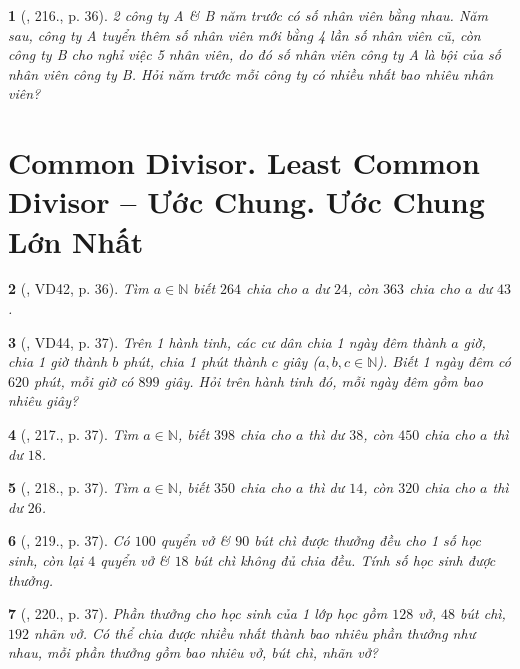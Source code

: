\documentclass{article}
\newtheorem{baitoan}{}
\begin{document}
\begin{baitoan}[\cite{Binh_Toan_6_tap_1}, 216., p. 36]
	2 công ty A \& B năm trước có số nhân viên bằng nhau. Năm sau, công ty A tuyển thêm số nhân viên mới bằng 4 lần số nhân viên cũ, còn công ty B cho nghỉ việc 5 nhân viên, do đó số nhân viên công ty A là bội của số nhân viên công ty B. Hỏi năm trước mỗi công ty có nhiều nhất bao nhiêu nhân viên?
\end{baitoan}


\section{Common Divisor. Least Common Divisor -- Ước Chung. Ước Chung Lớn Nhất}

\begin{baitoan}[\cite{Binh_Toan_6_tap_1}, VD42, p. 36]
	Tìm $a\in\mathbb{N}$ biết $264$ chia cho $a$ dư $24$, còn $363$ chia cho $a$ dư $43$.
\end{baitoan}

\begin{baitoan}[\cite{Binh_Toan_6_tap_1}, VD44, p. 37]
	Trên 1 hành tinh, các cư dân chia 1 ngày đêm thành $a$ giờ, chia 1 giờ thành $b$ phút, chia 1 phút thành $c$ giây ($a,b,c\in\mathbb{N}$). Biết 1 ngày đêm có $620$ phút, mỗi giờ có $899$ giây. Hỏi trên hành tinh đó, mỗi ngày đêm gồm bao nhiêu giây?
\end{baitoan}

\begin{baitoan}[\cite{Binh_Toan_6_tap_1}, 217., p. 37]
	Tìm $a\in\mathbb{N}$, biết $398$ chia cho $a$ thì dư $38$, còn $450$ chia cho $a$ thì dư $18$.
\end{baitoan}

\begin{baitoan}[\cite{Binh_Toan_6_tap_1}, 218., p. 37]
	Tìm $a\in\mathbb{N}$, biết $350$ chia cho $a$ thì dư $14$, còn $320$ chia cho $a$ thì dư $26$.
\end{baitoan}

\begin{baitoan}[\cite{Binh_Toan_6_tap_1}, 219., p. 37]
	Có $100$ quyển vở \& $90$ bút chì được thưởng đều cho 1 số học sinh, còn lại $4$ quyển vở \& $18$ bút chì không đủ chia đều. Tính số học sinh được thưởng.
\end{baitoan}

\begin{baitoan}[\cite{Binh_Toan_6_tap_1}, 220., p. 37]
	Phần thưởng cho học sinh của 1 lớp học gồm $128$ vở, $48$ bút chì, $192$ nhãn vở. Có thể chia được nhiều nhất thành bao nhiêu phần thưởng như nhau, mỗi phần thưởng gồm bao nhiêu vở, bút chì, nhãn vở?
\end{baitoan}
\end{document}
